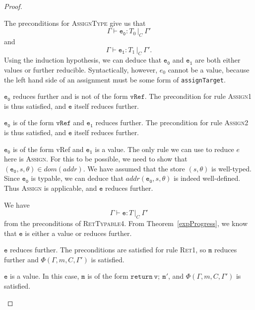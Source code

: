 \documentclass[12pt,a4paper,twoside,openright]{report}
\theoremstyle{definition}
\theoremstyle{dotless}
\newcommand{\typed}[2]{\Gamma{}\vdash\mathtt{#1}: #2\,|_C\:\Gamma'}
\newcommand{\indHyp}{\Phi(\Gamma, m, C, \Gamma')}
\begin{document}
\begin{proof}
  \begin{case}[AssignType]\label{assigntype}

	The preconditions for \textsc{AssignType} give us that
	$$\typed{e_0}{T_0}$$ and $$\typed{e_1}{T_1}.$$
   	Using the
	induction hypothesis, we can deduce that $\mathtt{e_0}$ and $\mathtt{e_1}$ are both either values
	or further reducible. Syntactically, however, $e_0$ cannot be a value, because the left
	hand side of an assignment must be some form of \texttt{assignTarget}.

	\begin{subcase}
	  $\mathtt{e_0}$ reduces further and is not of the form $\mathtt{vRef}$. 
	  The precondition for rule \textsc{Assign1} is thus satisfied, and $\mathtt{e}$
	  itself reduces further.
	\end{subcase}

	\begin{subcase}
	  $\mathtt{e_0}$ is of the form $\mathtt{vRef}$ and $\mathtt{e_1}$ reduces further. 
	  The precondition for rule \textsc{Assign2} is thus satisfied, and $\mathtt{e}$
	  itself reduces further.
	\end{subcase}

	\begin{subcase}
	  $\mathtt{e_0}$ is of the form vRef and $\mathtt{e_1}$ is a value.
	  The only rule we can use to reduce $e$ here is \textsc{Assign}. For this
	  to be possible, we need to show that $(\mathtt{e_0}, s, \theta) \in dom(addr)$.
	  We have assumed that the store $(s,\theta)$ is well-typed. Since $\mathtt{e_0}$ is typable, 
	  we can deduce that $addr(\mathtt{e_0},s,\theta)$
	  is indeed well-defined. Thus \textsc{Assign} is applicable, and $\mathtt{e}$
	  reduces further.  
	\end{subcase}

  \end{case}

  \begin{case}[RetTypable4]
	We have $$\typed{e}{T}$$ from
	the preconditions of \textsc{RetTypable4}. From Theorem~\ref{expProgress},
	we know that $\mathtt{e}$ is either a value or reduces further.

  	\begin{subcase}
  	  $\mathtt{e}$ reduces further.
  	  The preconditions are satisfied for rule \textsc{Ret1}, so $\mathtt{m}$ reduces
  	  further and $\indHyp$ is satisfied.  
  	\end{subcase}

  	\begin{subcase}
  	  $\mathtt{e}$ is a value.
  	  In this case, $\mathtt{m}$ is of the form $\mathtt{return\ v;\ m'}$, and $\indHyp$
	  is satisfied.
	\end{subcase}  


\end{case}
\end{proof}
\end{document}
